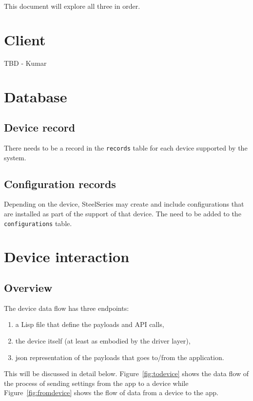 \documentclass[12pt]{article}
\begin{document}
This document will explore all three in order.


\section{Client}

TBD - Kumar

\section{Database}

\subsection{Device record}

There needs to be a record in the \verb|records| table for each device
supported by the system.

\subsection{Configuration records}

Depending on the device, SteelSeries may create and include
configurations that are installed as part of the support of that
device. The need to be added to the \verb|configurations| table.



\section{Device interaction}

\subsection{Overview}

The device data flow has three endpoints:
\begin{enumerate}
\item a Lisp file that define the payloads and API calls,
\item the device itself (at least as embodied by the driver layer),
\item json representation of the payloads that goes to/from the application.
\end{enumerate}

This will be discussed in detail below. Figure~\ref{fig:todevice}
shows the data flow of the process of sending settings from the app to a device
while Figure~\ref{fig:fromdevice} shows the flow of data from a device
to the app.
\end{document}
